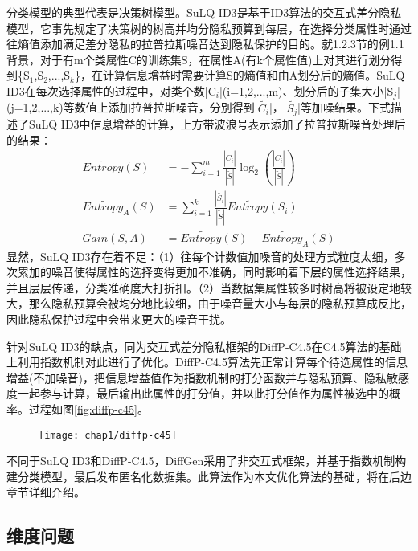 分类模型的典型代表是决策树模型。SuLQ ID3\cite{SuLQ}是基于ID3算法的交互式差分隐私模型，它事先规定了决策树的树高并均分隐私预算到每层，在选择分类属性时通过往熵值添加满足差分隐私的拉普拉斯噪音达到隐私保护的目的。就1.2.3节的例1.1背景，对于有m个类属性C的训练集S，在属性A(有k个属性值)上对其进行划分得到\{S$_{1}$,S$_{2}$,...,S$_{k}$\}，在计算信息增益时需要计算S的熵值和由A划分后的熵值。SuLQ ID3在每次选择属性的过程中，对类个数|C$_{i}$|(i=1,2,...,m)、划分后的子集大小|S$_{j}$|(j=1,2,...,k)等数值上添加拉普拉斯噪音，分别得到|$\widetilde{C_{i}}$|，|$\widetilde{S_{j}}$|等加噪结果。下式描述了SuLQ ID3中信息增益的计算，上方带波浪号表示添加了拉普拉斯噪音处理后的结果：
\[
\begin{split}
	En\widetilde{tro}py(S) &= -\sum_{i=1}^{m}\frac{|\widetilde{C_{i}}|}{|\widetilde{S}|}\log_{2}(\frac{|\widetilde{C_{i}}|}{|\widetilde{S}|})\\
	En\widetilde{tro}py_{A}(S) &= \sum_{i=1}^{k}\frac{|\widetilde{S_{i}}|}{|\widetilde{S}|}En\widetilde{tro}py(S_{i})\\
	Gain(S,A) &= En\widetilde{tro}py(S)-En\widetilde{tro}py_{A}(S)
\end{split}	
\]
显然，SuLQ ID3存在着不足：（1）往每个计数值加噪音的处理方式粒度太细，多次累加的噪音使得属性的选择变得更加不准确，同时影响着下层的属性选择结果，并且层层传递，分类准确度大打折扣。（2）当数据集属性较多时树高将被设定地较大，那么隐私预算会被均分地比较细，由于噪音量大小与每层的隐私预算成反比，因此隐私保护过程中会带来更大的噪音干扰。

针对SuLQ ID3的缺点，同为交互式差分隐私框架的DiffP-C4.5\cite{diffp-c4.5}在C4.5算法的基础上利用指数机制对此进行了优化。DiffP-C4.5算法先正常计算每个待选属性的信息增益(不加噪音)，把信息增益值作为指数机制的打分函数并与隐私预算、隐私敏感度一起参与计算，最后输出此属性的打分值，并以此打分值作为属性被选中的概率。过程如图\ref{fig:diffp-c45}。

\begin{figure}[!htp]
	\centering
	\texttt{[image: chap1/diffp-c45]}
\end{figure}

不同于SuLQ ID3和DiffP-C4.5，DiffGen\cite{DiffGen}采用了非交互式框架，并基于指数机制构建分类模型，最后发布匿名化数据集。此算法作为本文优化算法的基础，将在后边章节详细介绍。

\subsection{维度问题}

